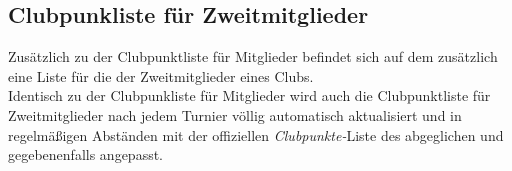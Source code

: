 \subsection{Clubpunkliste für Zweitmitglieder}

\noindent
Zusätzlich zu der Clubpunktliste für Mitglieder befindet sich auf dem \bb \ser zusätzlich eine Liste für
die \cps der Zweitmitglieder eines Clubs.\\[.1cm]

\noindent
Identisch zu der Clubpunkliste für Mitglieder wird auch die Clubpunktliste für Zweitmitglieder nach
jedem Turnier völlig automatisch aktualisiert und in regelmäßigen Abständen mit der offiziellen \textit{Clubpunkte-}Liste
des \dbvs abgeglichen und gegebenenfalls angepasst.
